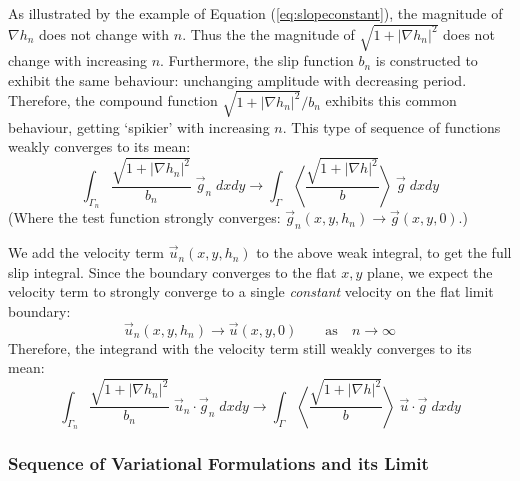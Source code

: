 \documentclass[12pt, a4paper, twoside, openright]{book}
\begin{document}
As illustrated by the example of Equation (\ref{eq:slopeconstant}), the magnitude of $\nabla h_n$ does not change with $n$.
Thus the the magnitude of $\sqrt{1 + \lvert \nabla h_n \rvert^2}$ does not change with increasing $n$. %
Furthermore, the slip function $b_n$ is constructed to exhibit the same behaviour: unchanging amplitude with decreasing period.
Therefore, the compound function $\sqrt{1 + \lvert \nabla h_n \rvert^2} /b_n$ exhibits this common behaviour, getting `spikier' with increasing $n$.
This type of sequence of functions weakly converges to its mean:
\begin{equation}
\int_{\Gamma_n} \frac{\sqrt{1 + \lvert \nabla h_n \rvert^2}}{b_n} \;
\vec{g}_n\;dxdy \to
\int_{\Gamma} \left< \frac{\sqrt{1 + \lvert \nabla h \rvert^2}}{b} \right> \;
\vec{g} \;dxdy
\end{equation}
(Where the test function strongly converges: $ \vec{g}_n(x,y,h_n) \to \vec{g}(x,y,0) $.)

We add the velocity term $\vec{u}_n(x,y,h_n)$ to the above weak integral, to get the full slip integral.  
Since the boundary converges to the flat $x,y$ plane, we expect the velocity term to strongly converge to a single \emph{constant} velocity on the flat limit boundary:
\begin{equation}
\vec{u}_n(x,y,h_n) \to \vec{u}(x,y,0) \qquad \text{as} \quad n \to \infty
\end{equation}
Therefore, the integrand with the velocity term
still weakly converges to its mean:
\begin{equation}
\int_{\Gamma_n} \frac{\sqrt{1 + \lvert \nabla h_n \rvert^2}}{b_n} \;
\vec{u}_n \cdot \vec{g}_n\;dxdy \to
\int_{\Gamma} \left< \frac{\sqrt{1 + \lvert \nabla h \rvert^2}}{b} \right> \;
\vec{u} \cdot \vec{g} \;dxdy
\end{equation}

\subsubsection{Sequence of Variational Formulations and its Limit}

\end{document}
